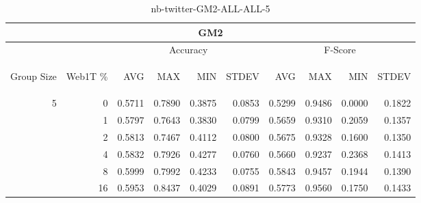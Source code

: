 \begin{center}
\begin{table}[htbp]
\begin{center}
\begin{tabular}{ | r | r | r | r | r | r | r | r | r | r |}
\hline
\multicolumn{10}{|c|}{GM2}\\
\hline
 & & \multicolumn{4}{|c|}{Accuracy} & \multicolumn{4}{|c|}{F-Score}\\ \cline{3-10}
\begin{sideways}Group Size\end{sideways} & \begin{sideways}Web1T \%\end{sideways} & \begin{sideways}AVG\end{sideways} & \begin{sideways}MAX\end{sideways} & \begin{sideways}MIN\end{sideways} & \begin{sideways}STDEV\end{sideways} & \begin{sideways}AVG\end{sideways} & \begin{sideways}MAX\end{sideways} & \begin{sideways}MIN\end{sideways} & \begin{sideways}STDEV\end{sideways}\\
\hline
\multirow{5}{*}{5}
 & 0 & 0.5711 & 0.7890 & 0.3875 & 0.0853 & 0.5299 & 0.9486 & 0.0000 & 0.1822\\ \cline{2-10}
 & 1 & 0.5797 & 0.7643 & 0.3830 & 0.0799 & 0.5659 & 0.9310 & 0.2059 & 0.1357\\ \cline{2-10}
 & 2 & 0.5813 & 0.7467 & 0.4112 & 0.0800 & 0.5675 & 0.9328 & 0.1600 & 0.1350\\ \cline{2-10}
 & 4 & 0.5832 & 0.7926 & 0.4277 & 0.0760 & 0.5660 & 0.9237 & 0.2368 & 0.1413\\ \cline{2-10}
 & 8 & 0.5999 & 0.7992 & 0.4233 & 0.0755 & 0.5843 & 0.9457 & 0.1944 & 0.1390\\ \cline{2-10}
 & 16 & 0.5953 & 0.8437 & 0.4029 & 0.0891 & 0.5773 & 0.9560 & 0.1750 & 0.1433\\ \cline{2-10}
\hline
\end{tabular}
\caption{nb-twitter-GM2-ALL-ALL-5}
\label{table:nb-twitter-GM2-ALL-ALL-5}
\end{center}
\end{table}
\end{center}

